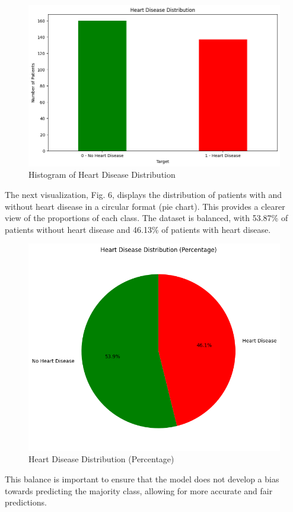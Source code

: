 \begin{figure}[ht] \centering \includegraphics[width=0.8\linewidth]{images/hist_heart_desease_distribution.png} \caption{Histogram of Heart Disease Distribution} \label{fig:heart_disease_histogram} \end{figure}

The next visualization, Fig. 6, displays the distribution of patients with and without heart disease in a circular format (pie chart). This provides a clearer view of the proportions of each class. The dataset is balanced, with 53.87\% of patients without heart disease and 46.13\% of patients with heart disease.

\begin{figure}[ht] \centering \includegraphics[width=0.75\linewidth]{images/heart_distribution_circular.png} \caption{Heart Disease Distribution (Percentage)} \label{fig:heart_disease_pie_chart} \end{figure}

This balance is important to ensure that the model does not develop a bias towards predicting the majority class, allowing for more accurate and fair predictions.


